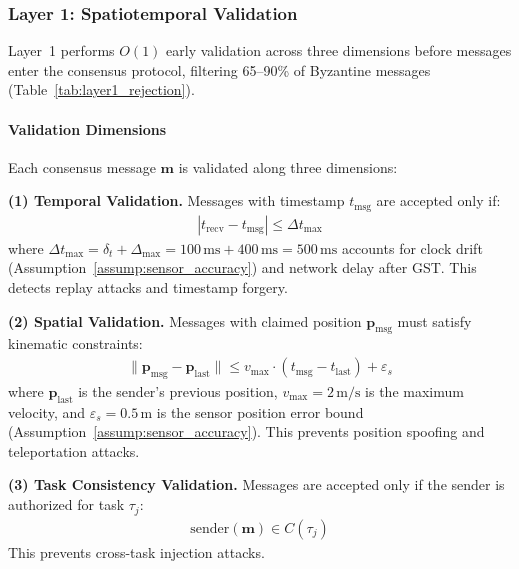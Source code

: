 \documentclass[manuscript,screen,review]{acmart}
\begin{document}
\subsubsection{Layer 1: Spatiotemporal Validation}
\label{sec:layer1}

Layer~1 performs $O(1)$ early validation across three dimensions before messages enter the consensus protocol, filtering 65--90\% of Byzantine messages (Table~\ref{tab:layer1_rejection}).

\paragraph{Validation Dimensions}

Each consensus message $\mathbf{m}$ is validated along three dimensions:

\textbf{(1) Temporal Validation.}
Messages with timestamp $t_{\text{msg}}$ are accepted only if:
\begin{equation}
\begin{aligned}
|t_{\text{recv}} - t_{\text{msg}}| \leq \Delta t_{\max}
\label{eq:temporal_validation}
\end{aligned}
\end{equation}
where $\Delta t_{\max} = \delta_t + \Delta_{\max} = 100\,\text{ms} + 400\,\text{ms} = 500\,\text{ms}$ accounts for clock drift (Assumption~\ref{assump:sensor_accuracy}) and network delay after GST. This detects replay attacks and timestamp forgery.

\textbf{(2) Spatial Validation.}
Messages with claimed position $\mathbf{p}_{\text{msg}}$ must satisfy kinematic constraints:
\begin{equation}
\begin{aligned}
\|\mathbf{p}_{\text{msg}} - \mathbf{p}_{\text{last}}\|
\leq v_{\max} \cdot (t_{\text{msg}} - t_{\text{last}}) +
\varepsilon_s
\label{eq:kinematic_validation}
\end{aligned}
\end{equation}
where $\mathbf{p}_{\text{last}}$ is the sender's previous position, $v_{\max} = 2\,\text{m/s}$ is the maximum velocity, and $\varepsilon_s = 0.5\,\text{m}$ is the sensor position error bound (Assumption~\ref{assump:sensor_accuracy}). This prevents position spoofing and teleportation attacks.

\textbf{(3) Task Consistency Validation.}
Messages are accepted only if the sender is authorized for task $\tau_j$:
\begin{equation}
\begin{aligned}
\text{sender}(\mathbf{m}) \in C(\tau_j)
\label{eq:task_consistency}
\end{aligned}
\end{equation}
This prevents cross-task injection attacks.
\end{document}

